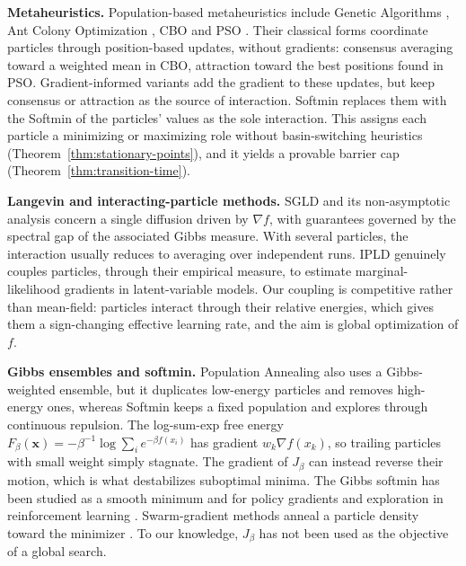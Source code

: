\documentclass{article} %
\theoremstyle{plain}
\theoremstyle{definition}
\theoremstyle{remark}
\newcommand{\xx}{\mathbf{x}}
\begin{document}
\textbf{Metaheuristics.} Population-based metaheuristics include Genetic Algorithms \citep{Goldberg1989}, Ant Colony Optimization \citep{DorigoStutzle2004}, CBO \citep{CarrilloChoiTotzeckTse2018,pinnau2017consensus,fornasier2024consensus} and PSO \citep{kennedy1995particle}. Their classical forms coordinate particles through position-based updates, without gradients: consensus averaging toward a weighted mean in CBO, attraction toward the best positions found in PSO. Gradient-informed variants \citep{carrillo2021consensus,noel2012new,riedl2023gradient,bolte2024swarm} add the gradient to these updates, but keep consensus or attraction as the source of interaction. Softmin replaces them with the Softmin of the particles' values as the sole interaction. This assigns each particle a minimizing or maximizing role without basin-switching heuristics (Theorem~\ref{thm:stationary-points}), and it yields a provable barrier cap (Theorem~\ref{thm:transition-time}).

\textbf{Langevin and interacting-particle methods.} SGLD \citep{welling2011bayesian} and its non-asymptotic analysis \citep{raginsky2017nonconvex} concern a single diffusion driven by $\nabla f$, with guarantees governed by the spectral gap of the associated Gibbs measure. With several particles, the interaction usually reduces to averaging over independent runs. IPLD \citep{akyildiz2025interacting,encinar2025proximal} genuinely couples particles, through their empirical measure, to estimate marginal-likelihood gradients in latent-variable models. Our coupling is competitive rather than mean-field: particles interact through their relative energies, which gives them a sign-changing effective learning rate, and the aim is global optimization of $f$.

\textbf{Gibbs ensembles and softmin.} Population Annealing \citep{Wang_2015} also uses a Gibbs-weighted ensemble, but it duplicates low-energy particles and removes high-energy ones, whereas Softmin keeps a fixed population and explores through continuous repulsion. The log-sum-exp free energy $F_\beta(\xx)=-\beta^{-1}\log\sum_ie^{-\beta f(x_i)}$ has gradient $w_k\nabla f(x_k)$, so trailing particles with small weight simply stagnate. The gradient of $J_\beta$ can instead reverse their motion, which is what destabilizes suboptimal minima. The Gibbs softmin has been studied as a smooth minimum \citep{bertsekas1999nonlinear} and for policy gradients and exploration in reinforcement learning \citep{mei2020global,song2019revisiting}. Swarm-gradient methods anneal a particle density toward the minimizer \citep{bolte2024swarm}. To our knowledge, $J_\beta$ has not been used as the objective of a global search.
\end{document}
